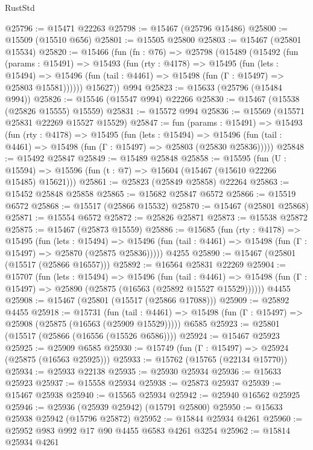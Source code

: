 \begin{lexlean}{RustStd}
\begin{coremodule}
@25796 := @15471 @22263
@25798 := @15467 (@25796 @15486)
@25800 := @15509 (@15510 @656)
@25801 := @15505 @25800
@25803 := @15467 (@25801 @15534)
@25820 := @15466
    (fun (fn : @76) =>
    @25798
      (@15489
        (@15492
          (fun (params : @15491) =>
          @15493
            (fun (rty : @4178) =>
            @15495
              (fun (lets : @15494) =>
              @15496 (fun (tail : @4461) => @15498 (fun (Γ : @15497) => @25803 @15581))))))
        @15627))
    @994
@25823 := @15633 (@25796 (@15484 @994))
@25826 := @15546 (@15547 @994) @22266
@25830 := @15467 (@15538 (@25826 @15555) @15559)
@25831 := @15572 @994
@25836 := @15569 (@15571 @25831 @22269 @15527 @15529)
@25847 := fun (params : @15491) =>
  @15493
    (fun (rty : @4178) =>
    @15495
      (fun (lets : @15494) =>
      @15496 (fun (tail : @4461) => @15498 (fun (Γ : @15497) => @25803 (@25830 @25836)))))
@25848 := @15492 @25847
@25849 := @15489 @25848
@25858 := @15595
    (fun (U : @15594) => @15596 (fun (t : @7) => @15604 (@15467 (@15610 @22266 @15485) @15621)))
@25861 := @25823 (@25849 @25858) @22264
@25863 := @15452 @25848 @25858
@25865 := @15682 @25847 @6572
@25866 := @15519 @6572
@25868 := @15517 (@25866 @15532)
@25870 := @15467 (@25801 @25868)
@25871 := @15554 @6572
@25872 := @25826 @25871
@25873 := @15538 @25872
@25875 := @15467 (@25873 @15559)
@25886 := @15685
    (fun (rty : @4178) =>
    @15495
      (fun (lets : @15494) =>
      @15496 (fun (tail : @4461) => @15498 (fun (Γ : @15497) => @25870 (@25875 @25836)))))
    @4255
@25890 := @15467 (@25801 (@15517 (@25866 @16557)))
@25892 := @16564 @25831 @22269
@25904 := @15707
    (fun (lets : @15494) =>
    @15496
      (fun (tail : @4461) =>
      @15498 (fun (Γ : @15497) => @25890 (@25875 (@16563 (@25892 @15527 @15529))))))
    @4455
@25908 := @15467 (@25801 (@15517 (@25866 @17088)))
@25909 := @25892 @4455
@25918 := @15731
    (fun (tail : @4461) => @15498 (fun (Γ : @15497) => @25908 (@25875 (@16563 (@25909 @15529)))))
    @6585
@25923 := @25801 (@15517 (@25866 (@16556 (@15526 @6586))))
@25924 := @15467 @25923
@25925 := @25909 @6585
@25930 := @15749 (fun (Γ : @15497) => @25924 (@25875 (@16563 @25925)))
@25933 := @15762 (@15765 (@22134 @15770))
@25934 := @25933 @22138
@25935 := @25930 @25934
@25936 := @15633 @25923
@25937 := @15558 @25934
@25938 := @25873 @25937
@25939 := @15467 @25938
@25940 := @15565 @25934
@25942 := @25940 @16562 @25925
@25946 := @25936 (@25939 @25942) (@15791 @25800)
@25950 := @15633 @25938 @25942 (@15796 @25872)
@25952 := @15844 @25934 @4261
@25960 := @25952 @983 @992 @17 @90 @4455 @6583 @4261 @3254
@25962 := @15814 @25934 @4261

\end{coremodule}
\end{lexlean}
